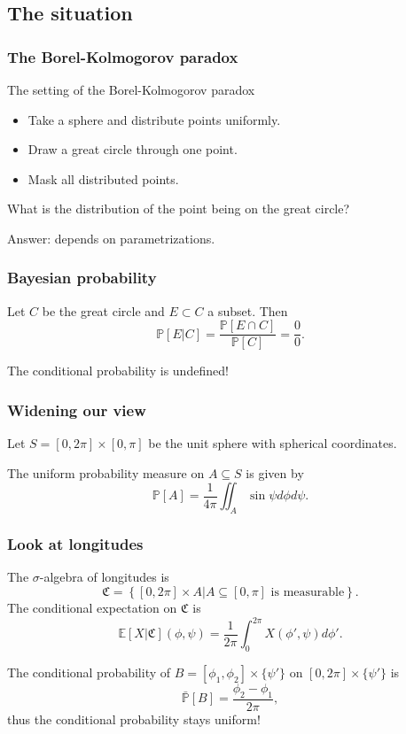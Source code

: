 \documentclass{beamer}
\theoremstyle{plain}
\theoremstyle{definition}
\theoremstyle{remark}
\renewcommand{\P}{\mathbb{P}}
\newcommand{\E}{\mathbb{E}}
\newcommand{\1}{\mathbbm{1}}
\begin{document}
\subsection*{The situation}
\begin{frame}
\frametitle{The Borel-Kolmogorov paradox}

\begin{exampleblock}{The setting of the Borel-Kolmogorov paradox}
\begin{itemize}
	\item Take a sphere and distribute points uniformly.
	\item Draw a great circle through one point.
	\item Mask all distributed points.
\end{itemize}
\end{exampleblock}
What is the distribution of the point being on the great circle?

\pause

Answer: depends on parametrizations.
\end{frame}

\begin{frame}
\frametitle{Bayesian probability}

Let $C$ be the great circle and $E\subset C$ a subset. Then
\[\P[E|C]=\frac{\P[E\cap C]}{\P[C]}=\frac{0}{0}.\]

The conditional probability is undefined!
\end{frame}

\begin{frame}
\frametitle{Widening our view}

Let $S=[0,2\pi]\times[0,\pi]$ be the unit sphere with spherical coordinates.

The uniform probability measure on $A\subseteq S$ is given by
\[\P[A]=\frac{1}{4\pi}\iint_A \sin\psi d\phi d\psi.\]
\end{frame}

\begin{frame}
\frametitle{Look at longitudes}
The $\sigma$-algebra of longitudes is 
\[\mathfrak{C}=\left\{[0,2\pi]\times A|A\subseteq[0,\pi]\text{ is measurable}\right\}.\]
The conditional expectation on $\mathfrak{C}$ is
\[\E[X|\mathfrak{C}](\phi,\psi)=\frac{1}{2\pi}\int_0^{2\pi}X(\phi',\psi)d\phi'.\]
\pause

The conditional probability of $B=[\phi_1,\phi_2]\times\{\psi'\}$ on $[0,2\pi]\times\{\psi'\}$ is
\[\bar{\P}[B]=\frac{\phi_2-\phi_1}{2\pi},\]
thus the conditional probability stays uniform! 
\end{frame}
\end{document}
